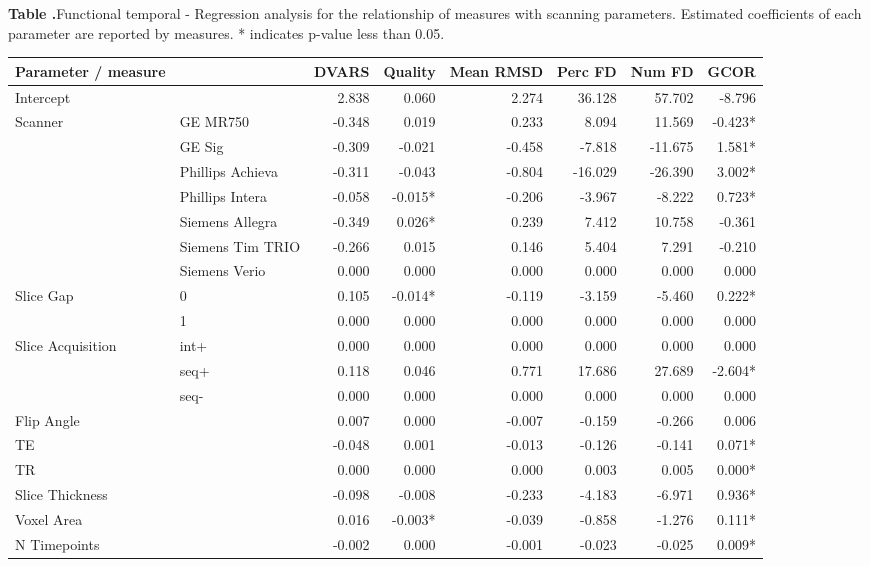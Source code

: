 \documentclass{frontiersSCNS} %
\begin{document}
\begin{table}
  \textbf{\label{func_temp_reg} Table .}{Functional temporal - Regression analysis for the relationship of measures with scanning parameters. Estimated coefficients of each parameter are reported by measures. * indicates p-value less than 0.05.}
  \begin{center}
  
    \begin{tabular}{ l l r r r r r r }
    \hline
    Parameter / measure & & DVARS & Quality & Mean RMSD & Perc FD & Num FD & GCOR \\ \hline
    Intercept & & 2.838 & 0.060 & 2.274 & 36.128 & 57.702 & -8.796 \\
    Scanner & GE MR750 & -0.348 & 0.019 & 0.233 & 8.094 & 11.569 & -0.423* \\
     & GE Sig & -0.309 & -0.021 & -0.458 & -7.818 & -11.675 & 1.581* \\
     & Phillips Achieva & -0.311 & -0.043 & -0.804 & -16.029 & -26.390 & 3.002* \\
     & Phillips Intera & -0.058 & -0.015* & -0.206 & -3.967 & -8.222 & 0.723* \\
     & Siemens Allegra & -0.349 & 0.026* & 0.239 & 7.412 & 10.758 & -0.361 \\
     & Siemens Tim TRIO & -0.266 & 0.015 & 0.146 & 5.404 & 7.291 & -0.210 \\
     & Siemens Verio & 0.000 & 0.000 & 0.000 & 0.000 & 0.000 & 0.000 \\
    Slice Gap & 0 & 0.105 & -0.014* & -0.119 & -3.159 & -5.460 & 0.222* \\
     & 1 & 0.000 & 0.000 & 0.000 & 0.000 & 0.000 & 0.000 \\
    Slice Acquisition & int+ & 0.000 & 0.000 & 0.000 & 0.000 & 0.000 & 0.000 \\
     & seq+ & 0.118 & 0.046 & 0.771 & 17.686 & 27.689 & -2.604* \\
     & seq- & 0.000 & 0.000 & 0.000 & 0.000 & 0.000 & 0.000 \\
    Flip Angle & & 0.007 & 0.000 & -0.007 & -0.159 & -0.266 & 0.006 \\
    TE & & -0.048 & 0.001 & -0.013 & -0.126 & -0.141 & 0.071* \\
    TR & & 0.000 & 0.000 & 0.000 & 0.003 & 0.005 & 0.000* \\
    Slice Thickness & & -0.098 & -0.008 & -0.233 & -4.183 & -6.971 & 0.936* \\
    Voxel Area & & 0.016 & -0.003* & -0.039 & -0.858 & -1.276 & 0.111* \\
    N Timepoints & & -0.002 & 0.000 & -0.001 & -0.023 & -0.025 & 0.009* \\
    \hline
    \end{tabular}
  \end{center}
\end{table}
\end{document}
